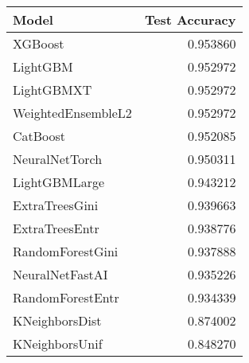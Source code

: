 \begin{tabular}{lr}
\toprule
Model & Test Accuracy \\
\midrule
XGBoost & 0.953860 \\
LightGBM & 0.952972 \\
LightGBMXT & 0.952972 \\
WeightedEnsembleL2 & 0.952972 \\
CatBoost & 0.952085 \\
NeuralNetTorch & 0.950311 \\
LightGBMLarge & 0.943212 \\
ExtraTreesGini & 0.939663 \\
ExtraTreesEntr & 0.938776 \\
RandomForestGini & 0.937888 \\
NeuralNetFastAI & 0.935226 \\
RandomForestEntr & 0.934339 \\
KNeighborsDist & 0.874002 \\
KNeighborsUnif & 0.848270 \\
\bottomrule
\end{tabular}

